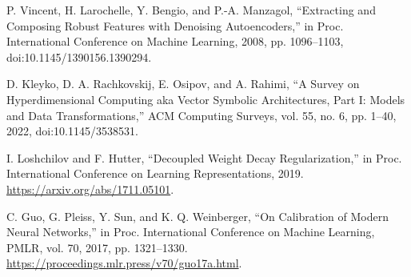 \documentclass[11pt,letterpaper]{article}
\begin{document}
\begin{enumerate}[label={[\arabic*]},leftmargin=6mm,labelsep=1.5mm,itemsep=3pt,parsep=0pt,topsep=0pt]
\item P. Vincent, H. Larochelle, Y. Bengio, and P.-A. Manzagol, “Extracting and Composing Robust Features with Denoising Autoencoders,” in Proc. International Conference on Machine Learning, 2008, pp. 1096–1103, doi:10.1145/1390156.1390294.

\item D. Kleyko, D. A. Rachkovskij, E. Osipov, and A. Rahimi, “A Survey on Hyperdimensional Computing aka Vector Symbolic Architectures, Part I: Models and Data Transformations,” ACM Computing Surveys, vol. 55, no. 6, pp. 1–40, 2022, doi:10.1145/3538531.

\item I. Loshchilov and F. Hutter, “Decoupled Weight Decay Regularization,” in Proc. International Conference on Learning Representations, 2019. \url{https://arxiv.org/abs/1711.05101}.

\item C. Guo, G. Pleiss, Y. Sun, and K. Q. Weinberger, “On Calibration of Modern Neural Networks,” in Proc. International Conference on Machine Learning, PMLR, vol. 70, 2017, pp. 1321–1330. \url{https://proceedings.mlr.press/v70/guo17a.html}.

\end{enumerate}
\end{document}
